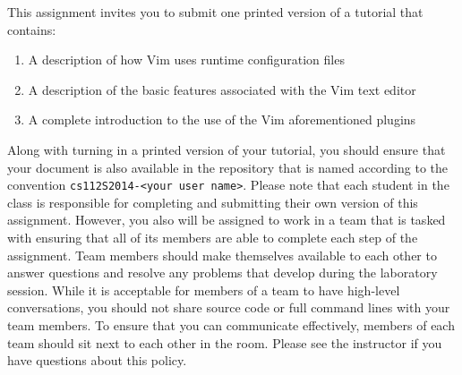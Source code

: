 This assignment invites you to submit one printed version of a tutorial that contains:

\begin{enumerate}
	
  \item A description of how Vim uses runtime configuration files

  \item A description of the basic features associated with the Vim text editor

  \item A complete introduction to the use of the Vim aforementioned plugins 

\end{enumerate}

Along with turning in a printed version of your tutorial, you should ensure that your document is also available in the repository
that is named according to the convention {\tt cs112S2014-<your user name>}. Please note that each student in the class is
responsible for completing and submitting their own version of this assignment.  However, you also will be assigned to work in a
team that is tasked with ensuring that all of its members are able to complete each step of the assignment.  Team members should
make themselves available to each other to answer questions and resolve any problems that develop during the laboratory session.
While it is acceptable for members of a team to have high-level conversations, you should not share source code or full command
lines with your team members. To ensure that you can communicate effectively, members of each team should sit next to each other
in the room.  Please see the instructor if you have questions about this policy.


